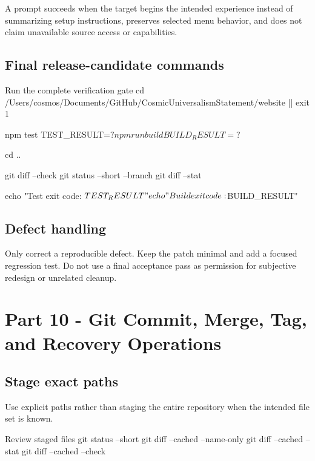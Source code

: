 \documentclass[11pt,letterpaper]{article}
\begin{document}
A prompt succeeds when the target begins the intended experience instead of
summarizing setup instructions, preserves selected menu behavior, and does not
claim unavailable source access or capabilities.

\subsection{Final release-candidate commands}

\begin{commandbox}{Run the complete verification gate}
cd /Users/cosmos/Documents/GitHub/CosmicUniversalismStatement/website || exit 1

npm test
TEST_RESULT=$?

npm run build
BUILD_RESULT=$?

cd ..

git diff --check
git status --short --branch
git diff --stat

echo "Test exit code:  $TEST_RESULT"
echo "Build exit code: $BUILD_RESULT"
\end{commandbox}

\subsection{Defect handling}

Only correct a reproducible defect. Keep the patch minimal and add a focused
regression test. Do not use a final acceptance pass as permission for subjective
redesign or unrelated cleanup.

\section{Part 10 - Git Commit, Merge, Tag, and Recovery Operations}

\subsection{Stage exact paths}

Use explicit paths rather than staging the entire repository when the intended
file set is known.

\begin{commandbox}{Review staged files}
git status --short
git diff --cached --name-only
git diff --cached --stat
git diff --cached --check
\end{commandbox}
\end{document}
